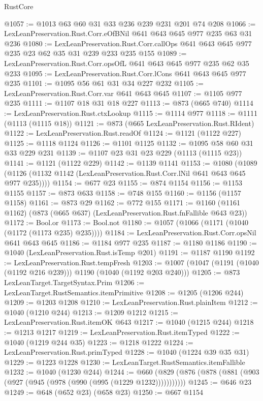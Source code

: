 \begin{lexlean}{RustCore}
\begin{coremodule}
@1057 := @1013 @63 @60 @31 @33 @236 @239 @231 @201 @74 @208
@1066 := LexLeanPreservation.Rust.Corr.eOfBNil @641 @643 @645 @977 @235 @63 @31 @236
@1080 := LexLeanPreservation.Rust.Corr.callOps
    @641
    @643
    @645
    @977
    @235
    @23
    @62
    @35
    @31
    @239
    @233
    @235
    @155
@1089 := LexLeanPreservation.Rust.Corr.opsOfL @641 @643 @645 @977 @235 @62 @35 @233
@1095 := LexLeanPreservation.Rust.Corr.lCons @641 @643 @645 @977 @235
@1101 := @1095 @56 @61 @31 @34 @227 @232
@1105 := LexLeanPreservation.Rust.Corr.var @641 @643 @645
@1107 := @1105 @977 @235
@1111 := @1107 @18 @31 @18 @227
@1113 := @873 (@665 @740)
@1114 := LexLeanPreservation.Rust.ctxLookup
@1115 := @1114 @977
@1118 := @1111 (@1113 (@1115 @18))
@1121 := @873 (@665 LexLeanPreservation.Rust.RIdent)
@1122 := LexLeanPreservation.Rust.readOf
@1124 := @1121 (@1122 @227)
@1125 := @1118 @1124
@1126 := @1101 @1125
@1132 := @1095 @58 @60 @31 @33 @229 @231
@1139 := @1107 @23 @31 @23 @229 (@1113 (@1115 @23))
@1141 := @1121 (@1122 @229)
@1142 := @1139 @1141
@1153 := @1080
    (@1089 (@1126 (@1132 @1142 (LexLeanPreservation.Rust.Corr.lNil @641 @643 @645 @977 @235))))
@1154 := @677 @23
@1155 := @874 @1154
@1156 := @1153 @1155
@1157 := @873 @633
@1158 := @748 @155
@1160 := @1156 (@1157 @1158)
@1161 := @873 @29
@1162 := @772 @155
@1171 := @1160 (@1161 @1162) (@873 (@665 @637) (LexLeanPreservation.Rust.fnFallible @643 @23))
@1172 := Bool.or
@1173 := Bool.not
@1180 := @1057 (@1066 (@1171 (@1040 (@1172 (@1173 @235) @235))))
@1184 := LexLeanPreservation.Rust.Corr.opsNil @641 @643 @645
@1186 := @1184 @977 @235
@1187 := @1180 @1186
@1190 := @1040 (LexLeanPreservation.Rust.isTemp @201)
@1191 := @1187 @1190
@1192 := LexLeanPreservation.Rust.tempFresh
@1203 := @1007 (@1047 (@1191 (@1040 (@1192 @216 @239))) @1190 (@1040 (@1192 @203 @240)))
@1205 := @873 LexLeanTarget.TargetSyntax.Prim
@1206 := LexLeanTarget.RustSemantics.itemPrimitive
@1208 := @1205 (@1206 @244)
@1209 := @1203 @1208
@1210 := LexLeanPreservation.Rust.plainItem
@1212 := @1040 (@1210 @244)
@1213 := @1209 @1212
@1215 := LexLeanPreservation.Rust.itemOK @643
@1217 := @1040 (@1215 @244)
@1218 := @1213 @1217
@1219 := LexLeanPreservation.Rust.itemTyped
@1222 := @1040 (@1219 @244 @35)
@1223 := @1218 @1222
@1224 := LexLeanPreservation.Rust.primTyped
@1228 := @1040 (@1224 @39 @35 @31)
@1229 := @1223 @1228
@1230 := LexLeanTarget.RustSemantics.itemFallible
@1232 := @1040 (@1230 @244)
@1244 := @660 (@829 (@876 (@878 (@881 (@903 (@927 (@945 (@978 (@990 (@995 (@1229 @1232)))))))))))
@1245 := @646 @23
@1249 := @648 (@652 @23) (@658 @23)
@1250 := @667 @1154

\end{coremodule}
\end{lexlean}
